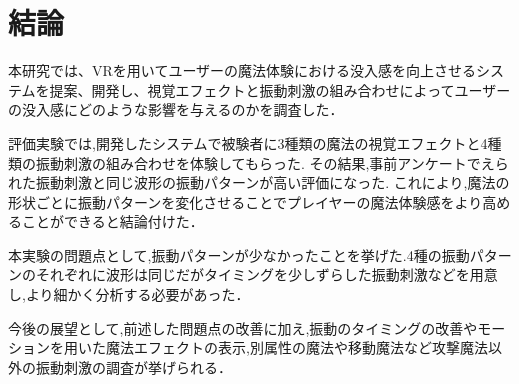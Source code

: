 \chapter{結論}
本研究では、VRを用いてユーザーの魔法体験における没入感を向上させるシステムを提案、開発し、視覚エフェクトと振動刺激の組み合わせによってユーザーの没入感にどのような影響を与えるのかを調査した．

評価実験では,開発したシステムで被験者に3種類の魔法の視覚エフェクトと4種類の振動刺激の組み合わせを体験してもらった.
その結果,事前アンケートでえられた振動刺激と同じ波形の振動パターンが高い評価になった.
これにより,魔法の形状ごとに振動パターンを変化させることでプレイヤーの魔法体験感をより高めることができると結論付けた．

本実験の問題点として,振動パターンが少なかったことを挙げた.4種の振動パターンのそれぞれに波形は同じだがタイミングを少しずらした振動刺激などを用意し,より細かく分析する必要があった．

今後の展望として,前述した問題点の改善に加え,振動のタイミングの改善やモーションを用いた魔法エフェクトの表示,別属性の魔法や移動魔法など攻撃魔法以外の振動刺激の調査が挙げられる．


\begin{comment}
    \textblockcolour{pink}
    \begin{textblock}{4}(16, 1)
        【5】本文はここまで
    \end{textblock}
    
    \begin{textblock}{7}(11, 28)
        本文は20ページ以上を目安とする。
    \end{textblock}
\end{comment}
  